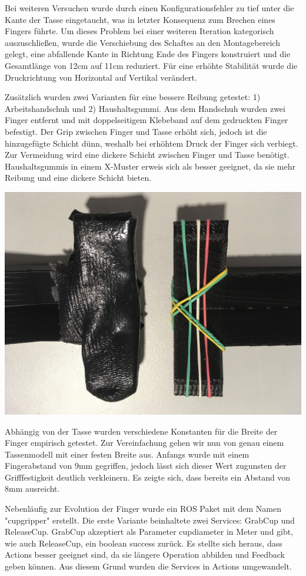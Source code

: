Bei weiteren Versuchen wurde durch einen Konfigurationsfehler zu tief unter die Kante der Tasse eingetaucht, was in letzter Konsequenz zum Brechen eines Fingers führte. Um dieses Problem bei einer weiteren Iteration kategorisch auszuschließen, wurde die Verschiebung des Schaftes an den Montagebereich gelegt, eine abfallende Kante in Richtung Ende des Fingers konstruiert und die Gesamtlänge von 12cm auf 11cm reduziert. Für eine erhöhte Stabilität wurde die Druckrichtung von Horizontal auf Vertikal verändert.

Zusätzlich wurden zwei Varianten für eine bessere Reibung getestet: 1) Arbeitshandschuh und 2) Haushaltsgummi. Aus dem Handschuh wurden zwei Finger entfernt und mit doppelseitigem Klebeband auf dem gedruckten Finger befestigt. Der Grip zwischen Finger und Tasse erhöht sich, jedoch ist die hinzugefügte Schicht dünn, weshalb bei erhöhtem Druck der Finger sich verbiegt. Zur Vermeidung wird eine dickere Schicht zwischen Finger und Tasse benötigt. Haushaltsgummis in einem X-Muster erweis sich als besser geeignet, da sie mehr Reibung und eine dickere Schicht bieten.

\includegraphics[width=\textwidth]{images/finger_tip.JPG}

Abhängig von der Tasse wurden verschiedene Konstanten für die Breite der Finger empirisch getestet. Zur Vereinfachung gehen wir nun von genau einem Tassenmodell mit einer festen Breite aus. Anfangs wurde mit einem Fingerabstand von 9mm gegriffen, jedoch lässt sich dieser Wert zugunsten der Grifffestigkeit deutlich verkleinern. Es zeigte sich, dass bereits ein Abstand von 8mm ausreicht.

Nebenläufig zur Evolution der Finger wurde ein ROS Paket mit dem Namen "cup\textunderscore gripper" erstellt. Die erste Variante beinhaltete zwei Services: GrabCup und ReleaseCup. GrabCup akzeptiert als Parameter cup\textunderscore diameter in Meter und gibt, wie auch ReleaseCup, ein boolean success zurück. Es stellte sich heraus, dass Actions besser geeignet sind, da sie längere Operation abbilden und Feedback geben können. Aus diesem Grund wurden die Services in Actions umgewandelt.
